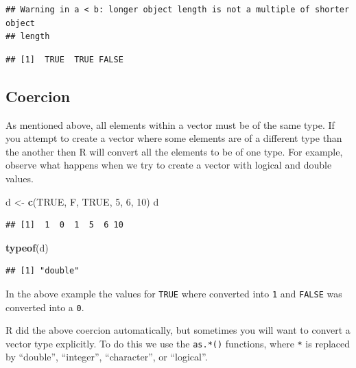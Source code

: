 \documentclass[
]{book}
\newenvironment{Shaded}{\begin{snugshade}}{\end{snugshade}}
\newcommand{\DecValTok}[1]{\textcolor[rgb]{0.00,0.00,0.81}{#1}}
\newcommand{\KeywordTok}[1]{\textcolor[rgb]{0.13,0.29,0.53}{\textbf{#1}}}
\newcommand{\NormalTok}[1]{#1}
\newcommand{\OtherTok}[1]{\textcolor[rgb]{0.56,0.35,0.01}{#1}}
\newcommand{\StringTok}[1]{\textcolor[rgb]{0.31,0.60,0.02}{#1}}
\begin{document}
\begin{verbatim}
## Warning in a < b: longer object length is not a multiple of shorter object
## length
\end{verbatim}

\begin{verbatim}
## [1]  TRUE  TRUE FALSE
\end{verbatim}

\hypertarget{coercion}{%
\subsection{Coercion}\label{coercion}}

As mentioned above, all elements within a vector must be of the same type. If you attempt to create a vector where some elements are of a different type than the another then R will convert all the elements to be of one type. For example, observe what happens when we try to create a vector with logical and double values.

\begin{Shaded}
\begin{Highlighting}[]
\NormalTok{d <-}\StringTok{ }\KeywordTok{c}\NormalTok{(}\OtherTok{TRUE}\NormalTok{, F, }\OtherTok{TRUE}\NormalTok{, }\DecValTok{5}\NormalTok{, }\DecValTok{6}\NormalTok{, }\DecValTok{10}\NormalTok{)}
\NormalTok{d}
\end{Highlighting}
\end{Shaded}

\begin{verbatim}
## [1]  1  0  1  5  6 10
\end{verbatim}

\begin{Shaded}
\begin{Highlighting}[]
\KeywordTok{typeof}\NormalTok{(d)}
\end{Highlighting}
\end{Shaded}

\begin{verbatim}
## [1] "double"
\end{verbatim}

In the above example the values for \texttt{TRUE} where converted into \texttt{1} and \texttt{FALSE} was converted into a \texttt{0}.

R did the above coercion automatically, but sometimes you will want to convert a vector type explicitly. To do this we use the \texttt{as.*()} functions, where \texttt{*} is replaced by ``double'', ``integer'', ``character'', or ``logical''.
\end{document}

